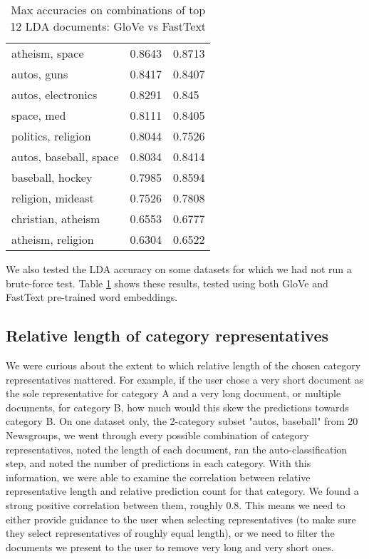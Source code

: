 \begin{table}[]
\begin{tabular}{lll}
atheism, space                              & 0.8643       & 0.8713                 \\
autos, guns                                 & 0.8417       & 0.8407                 \\
autos, electronics                          & 0.8291       & 0.845                  \\
space, med                                  & 0.8111       & 0.8405                 \\
politics, religion                          & 0.8044       & 0.7526                 \\
autos, baseball, space                       & 0.8034       & 0.8414                 \\
baseball, hockey                            & 0.7985       & 0.8594                 \\
religion, mideast                           & 0.7526       & 0.7808                 \\
christian, atheism                          & 0.6553       & 0.6777                 \\
atheism, religion                           & 0.6304       & 0.6522                 \\
\bottomrule
\end{tabular}
\caption{Max accuracies on combinations of top 12 LDA documents: GloVe vs FastText}\label{lda_fasttext}
\end{table}


We also tested the LDA accuracy on some datasets for which we had not run a brute-force test. Table \ref{lda_fasttext} shows these results, tested using both GloVe and FastText pre-trained word embeddings.

\subsection{Relative length of category representatives}
We were curious about the extent to which relative length of the chosen category representatives mattered. For example, if the user chose a very short document as the sole representative for category A and a very long document, or multiple documents, for category B, how much would this skew the predictions towards category B. On one dataset only, the 2-category subset "autos, baseball" from 20 Newsgroups, we went through every possible combination of category representatives, noted the length of each document, ran the auto-classification step, and noted the number of predictions in each category. With this information, we were able to examine the correlation between relative representative length and relative prediction count for that category. We found a strong positive correlation between them, roughly 0.8. This means we need to either provide guidance to the user when selecting representatives (to make sure they select representatives of roughly equal length), or we need to filter the documents we present to the user to remove very long and very short ones.

